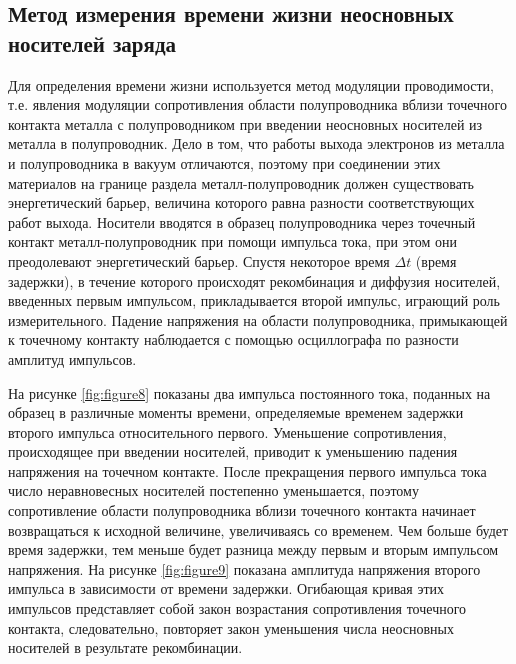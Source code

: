 \subsection{Метод измерения времени жизни неосновных носителей заряда}

Для определения времени жизни используется метод модуляции проводимости, т.е. явления модуляции сопротивления области
полупроводника вблизи точечного контакта металла с полупроводником при введении неосновных носителей из металла в
полупроводник. Дело в том, что работы выхода электронов из металла и полупроводника в вакуум отличаются, поэтому при
соединении этих материалов на границе раздела металл-полупроводник должен существовать энергетический барьер, величина
которого равна разности соответствующих работ выхода. Носители вводятся в образец полупроводника через точечный контакт
металл-полупроводник при помощи импульса тока, при этом они преодолевают энергетический барьер. Спустя некоторое время
$\Delta t$ (время задержки), в течение которого происходят рекомбинация и диффузия носителей, введенных первым
импульсом, прикладывается второй импульс, играющий роль измерительного. Падение напряжения на области полупроводника,
примыкающей к точечному контакту наблюдается с помощью осциллографа по разности амплитуд импульсов.

На рисунке \ref{fig:figure8} показаны два импульса постоянного тока, поданных на образец в различные моменты времени,
определяемые временем задержки второго импульса относительного первого. Уменьшение сопротивления, происходящее при
введении носителей, приводит к уменьшению падения напряжения на точечном контакте. После прекращения первого
импульса тока число неравновесных носителей постепенно уменьшается, поэтому сопротивление
области полупроводника вблизи точечного контакта начинает возвращаться к исходной величине, увеличиваясь со временем.
Чем больше будет время задержки, тем меньше будет разница между первым и вторым импульсом напряжения. На рисунке \ref{fig:figure9} показана
амплитуда напряжения второго импульса в зависимости от времени задержки. Огибающая кривая этих импульсов представляет
собой закон возрастания сопротивления точечного контакта, следовательно, повторяет закон уменьшения числа неосновных
носителей в результате рекомбинации.

